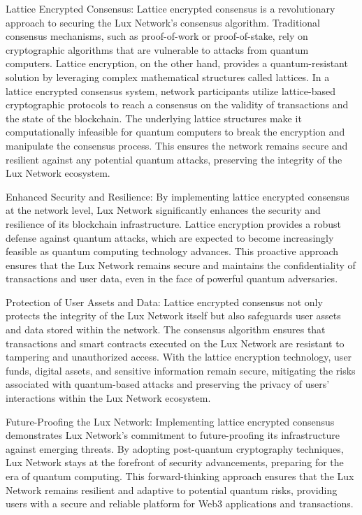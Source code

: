 \documentclass[11pt]{article}
\begin{document}
Lattice Encrypted Consensus: Lattice encrypted consensus is a revolutionary approach to securing the Lux Network's consensus algorithm. Traditional consensus mechanisms, such as proof-of-work or proof-of-stake, rely on cryptographic algorithms that are vulnerable to attacks from quantum computers. Lattice encryption, on the other hand, provides a quantum-resistant solution by leveraging complex mathematical structures called lattices.
In a lattice encrypted consensus system, network participants utilize lattice-based cryptographic protocols to reach a consensus on the validity of transactions and the state of the blockchain. The underlying lattice structures make it computationally infeasible for quantum computers to break the encryption and manipulate the consensus process. This ensures the network remains secure and resilient against any potential quantum attacks, preserving the integrity of the Lux Network ecosystem.


Enhanced Security and Resilience: By implementing lattice encrypted consensus at the network level, Lux Network significantly enhances the security and resilience of its blockchain infrastructure. Lattice encryption provides a robust defense against quantum attacks, which are expected to become increasingly feasible as quantum computing technology advances. This proactive approach ensures that the Lux Network remains secure and maintains the confidentiality of transactions and user data, even in the face of powerful quantum adversaries.


Protection of User Assets and Data: Lattice encrypted consensus not only protects the integrity of the Lux Network itself but also safeguards user assets and data stored within the network. The consensus algorithm ensures that transactions and smart contracts executed on the Lux Network are resistant to tampering and unauthorized access. With the lattice encryption technology, user funds, digital assets, and sensitive information remain secure, mitigating the risks associated with quantum-based attacks and preserving the privacy of users' interactions within the Lux Network ecosystem.


Future-Proofing the Lux Network: Implementing lattice encrypted consensus demonstrates Lux Network's commitment to future-proofing its infrastructure against emerging threats. By adopting post-quantum cryptography techniques, Lux Network stays at the forefront of security advancements, preparing for the era of quantum computing. This forward-thinking approach ensures that the Lux Network remains resilient and adaptive to potential quantum risks, providing users with a secure and reliable platform for Web3 applications and transactions.
\end{document}
